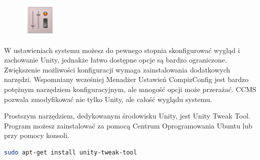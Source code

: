 \begin{figure}
	\vspace{-10pt}
	\includegraphics[width=\linewidth]{images/ikony_unitytweaktool.png}
\end{figure}

W \textcolor{ubuntu_orange}{ustawieniach systemu} możesz do pewnego stopnia skonfigurować wygląd i zachowanie Unity, jednakże łatwo dostępne opcje są bardzo ograniczone. Zwiększenie możliwości konfiguracji wymaga zainstalowania dodatkowych narzędzi. Wspomniany wcześniej Menadżer Ustawień CompizConfig jest bardzo potężnym narzędziem konfiguracyjnym, ale mnogość opcji może przerażać. CCMS pozwala zmodyfikować nie tylko Unity, ale całość wyglądu systemu.

Prostszym narzędziem, dedykowanym środowisku Unity, jest \textcolor{ubuntu_orange}{Unity Tweak Tool}. Program możesz zainstalować za pomocą Centrum Oprogramowania Ubuntu lub przy pomocy konsoli.
\begin{lstlisting}[language=bash]
sudo apt-get install unity-tweak-tool
\end{lstlisting}
